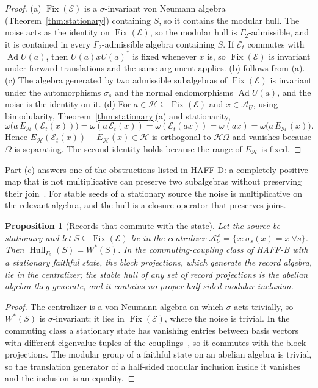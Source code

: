 \documentclass[12pt]{article}
\newtheorem{proposition}[theorem]{Proposition}
\theoremstyle{definition}
\theoremstyle{remark}
\newcommand{\Fix}{\operatorname{Fix}}
\newcommand{\Hull}{\operatorname{Hull}}
\newcommand{\AU}{\mathcal A_U}
\newcommand{\Ad}{\operatorname{Ad}}
\begin{document}
\begin{proof}
(a) \(\Fix(\mathcal E)\) is a \(\sigma\)-invariant von Neumann algebra
(Theorem~\ref{thm:stationary}) containing \(S\), so it contains the modular hull. The
noise acts as the identity on \(\Fix(\mathcal E)\), so the modular hull is
\(\Gamma_2\)-admissible, and it is contained in every \(\Gamma_2\)-admissible algebra
containing \(S\). If \(\mathcal E_t\) commutes with \(\Ad U(a)\), then
\(U(a)xU(a)^*\) is fixed whenever \(x\) is, so \(\Fix(\mathcal E)\) is invariant under
forward translations and the same argument applies. (b) follows from (a). (c) The
algebra generated by two admissible subalgebras of \(\Fix(\mathcal E)\) is invariant
under the automorphisms \(\sigma_s\) and the normal endomorphisms \(\Ad U(a)\), and the
noise is the identity on it. (d) For \(a\in\mathcal H\subseteq\Fix(\mathcal E)\) and
\(x\in\AU\), using bimodularity, Theorem~\ref{thm:stationary}(a) and stationarity,
\[
\omega\bigl(a\,E_{\mathcal H}(\mathcal E_t(x))\bigr)=\omega(a\,\mathcal E_t(x))
=\omega(\mathcal E_t(ax))=\omega(ax)=\omega\bigl(a\,E_{\mathcal H}(x)\bigr).
\]
Hence \(E_{\mathcal H}(\mathcal E_t(x))-E_{\mathcal H}(x)\in\mathcal H\) is orthogonal to
\(\mathcal H\Omega\) and vanishes because \(\Omega\) is separating. The second identity
holds because the range of \(E_{\mathcal H}\) is fixed.
\end{proof}

Part (c) answers one of the obstructions listed in HAFF-D: a completely positive map
that is not multiplicative can preserve two subalgebras without preserving their
join~\cite{HAFFD}. For stable seeds of a stationary source the noise is multiplicative
on the relevant algebra, and the hull is a closure operator that preserves joins.

\begin{proposition}[Records that commute with the state]\label{prop:records}
Let the source be stationary and let \(S\subseteq\Fix(\mathcal E)\) lie in the
centralizer \(\AU^\omega=\{x:\sigma_s(x)=x\ \forall s\}\). Then
\(\Hull_{\Gamma_2}(S)=W^*(S)\). In the commuting-coupling class of HAFF-B with a
stationary faithful state, the block projections, which generate the record algebra,
lie in the centralizer; the stable hull of any set of record projections is the
abelian algebra they generate, and it contains no proper half-sided modular inclusion.
\end{proposition}

\begin{proof}
The centralizer is a von Neumann algebra on which \(\sigma\) acts trivially, so
\(W^*(S)\) is \(\sigma\)-invariant; it lies in \(\Fix(\mathcal E)\), where the noise is
trivial. In the commuting class a stationary state has vanishing entries between basis
vectors with different eigenvalue tuples of the couplings~\cite{HAFFB}, so it commutes
with the block projections. The modular group of a faithful state on an abelian algebra
is trivial, so the translation generator of a half-sided modular inclusion inside it
vanishes~\cite{AZ} and the inclusion is an equality.
\end{proof}
\end{document}
